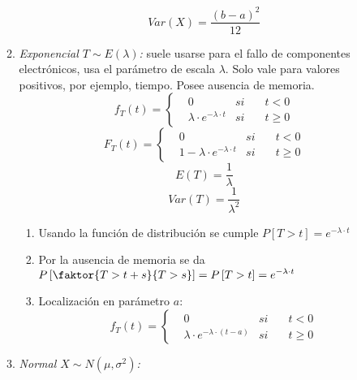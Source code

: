 \documentclass[a4paper, twocolumn, 10pt]{article}
\begin{document}
\begin{itemize}
\begin{enumerate}
\begin{equation*}
		\end{equation*}
		\begin{equation*}
			Var(X) = \frac{(b-a)^2}{12}
		\end{equation*}
		\item \textit{Exponencial $T\sim E(\lambda)$:} suele usarse para el fallo de componentes electrónicos, usa el parámetro de escala $\lambda$. Solo vale para valores positivos, por ejemplo, tiempo. Posee ausencia de memoria.
		\begin{equation*}
			f_T(t) = \left\lbrace
			\begin{aligned}
			& 0 & si \quad& t < 0 \\
			& \lambda\cdot e^{-\lambda \cdot t} & si \quad & t \ge 0
			\end{aligned} \right.
		\end{equation*}
		\begin{equation*}
			F_T(t) = \left\lbrace
			\begin{aligned}
			& 0 & si \quad& t < 0 \\
			& 1 - \lambda\cdot e^{-\lambda \cdot t} & si \quad & t \ge 0
			\end{aligned} \right.
		\end{equation*}
		\begin{equation*}
			E(T) = \frac{1}{\lambda}
		\end{equation*}
		\begin{equation*}
			Var(T) = \frac{1}{\lambda^2}
		\end{equation*}
		\begin{enumerate}
			\item Usando la función de distribución se cumple $P\left[T>t\right] = e^{-\lambda\cdot t}$
			\item Por la ausencia de memoria se da $\displaystyle P\left[\faktor{T > t+s}{T>s}\right] = P\left[T>t\right] = e^{-\lambda\cdot t}$
			\item Localización en parámetro $a$:
			\begin{equation*}
			f_T(t) = \left\lbrace
			\begin{aligned}
			& 0 & si \quad& t < 0 \\
			& \lambda\cdot e^{-\lambda \cdot (t-a)} & si \quad & t \ge 0
			\end{aligned} \right.
			\end{equation*}
		\end{enumerate}
		\item \textit{Normal $X\sim N(\mu, \sigma^2)$:}
		\begin{equation*}

\end{equation*}
\end{enumerate}
\end{itemize}
\end{document}
